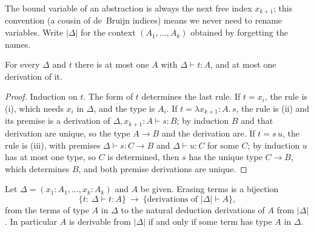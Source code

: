 The bound variable of an abstraction is always the next free index $x_{k+1}$; this convention (a cousin of de~Bruijn indices) means we never need to rename variables. Write $|\Delta|$ for the
context $(A_1,\dots,A_k)$ obtained by forgetting the names.

\begin{lemma}\label{lem:uniquetype}
For every $\Delta$ and $t$ there is at most one $A$ with $\Delta\vdash t:A$, and at most one derivation of it.
\end{lemma}

\begin{proof}
Induction on $t$. The form of $t$ determines the last rule. If $t=x_i$, the rule is (i), which needs $x_i$ in $\Delta$, and the type is $A_i$. If $t=\lambda x_{k+1}{:}A.\,s$, the rule is (ii) and its premise
is a derivation of $\Delta,x_{k+1}{:}A\vdash s:B$; by induction $B$ and that derivation are unique, so the type $A\to B$ and the derivation are. If $t=s\,u$, the rule is (iii), with premises
$\Delta\vdash s:C\to B$ and $\Delta\vdash u:C$ for some $C$; by induction $u$ has at most one type, so $C$ is determined, then $s$ has the unique type $C\to B$, which determines $B$, and both
premise derivations are unique.
\end{proof}

\begin{theorem}\label{thm:curryhoward}
Let $\Delta=(x_1{:}A_1,\dots,x_k{:}A_k)$ and $A$ be given. Erasing terms is a bijection
\[
\{t:\ \Delta\vdash t:A\}\ \longrightarrow\ \{\text{derivations of }|\Delta|\vdash A\},
\]
from the terms of type $A$ in $\Delta$ to the natural deduction derivations of $A$ from $|\Delta|$. In particular $A$ is derivable from $|\Delta|$ if and only if some term has type $A$ in $\Delta$.
\end{theorem}

